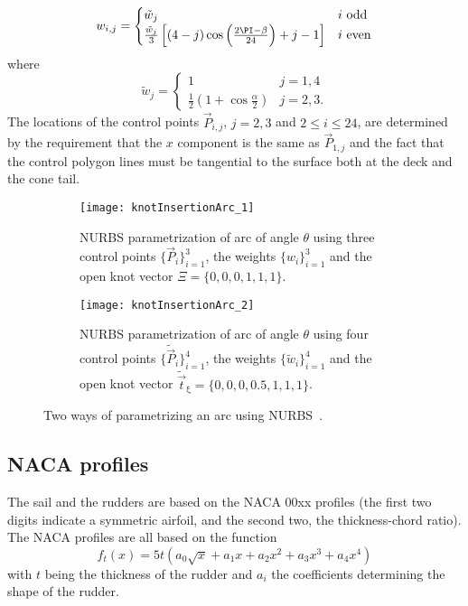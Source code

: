 \begin{equation*}
	w_{i,j} = \begin{cases}
		\tilde{w}_j & i\,\, \text{odd}\\
		\frac{\tilde{w}_j}{3}\left[(4-j)\cos\left(\frac{2\PI-\beta}{24}\right)+j-1\right] & i\,\, \text{even}
		\end{cases}		
\end{equation*}
where
\begin{equation*}
	\tilde{w}_j = \begin{cases}
		1 & j = 1,4\\
		\frac{1}{2}\left(1+\cos\frac{\alpha}{2}\right) & j = 2,3.
	\end{cases}
\end{equation*}
The locations of the control points $\vec{P}_{i,j}$, $j=2,3$ and $2\leq i\leq 24$, are determined by the requirement that the $x$ component is the same as $\vec{P}_{1,j}$ and the fact that the control polygon lines must be tangential to the surface both at the deck and the cone tail.
\begin{figure}
	\centering    
	\begin{subfigure}{0.44\textwidth}
		\centering
		\texttt{[image: knotInsertionArc\_1]}
		\caption{NURBS parametrization of arc of angle $\theta$ using three control points $\{\vec{P}_i\}_{i=1}^3$, the weights $\{w_i\}_{i=1}^3$ and the open knot vector $\Xi=\{0,0,0,1,1,1\}$.}
		\label{Fig3:arcParam1}
	\end{subfigure}%
	\hspace*{0.02\textwidth}%
	\begin{subfigure}{0.54\textwidth}
		\centering
		\texttt{[image: knotInsertionArc\_2]}
		\caption{NURBS parametrization of arc of angle $\theta$ using four control points $\{\tilde{\vec{P}}_i\}_{i=1}^4$, the weights $\{\tilde{w}_i\}_{i=1}^4$ and the open knot vector $\tilde{\vec{t}}_\upxi=\{0,0,0,0.5,1,1,1\}$.}
		\label{Fig3:arcParam2}
	\end{subfigure}
	\caption{Two ways of parametrizing an arc using NURBS~\cite[p. 315]{Piegl1997tnb}.}
\end{figure}

\subsection{NACA profiles}
The sail and the rudders are based on the NACA 00xx profiles \cite{Ladson1996cpt,Cummings2015gfa} (the first two digits indicate a symmetric airfoil, and the second two, the thickness-chord ratio). The NACA profiles are all based on the function
\begin{equation}\label{Eq3:NACA}
	f_t(x) = 5t\left(a_0\sqrt{x} + a_1x +a_2x^2+a_3x^3+a_4x^4\right)
\end{equation}
with $t$ being the thickness of the rudder and $a_i$ the coefficients determining the shape of the rudder.

